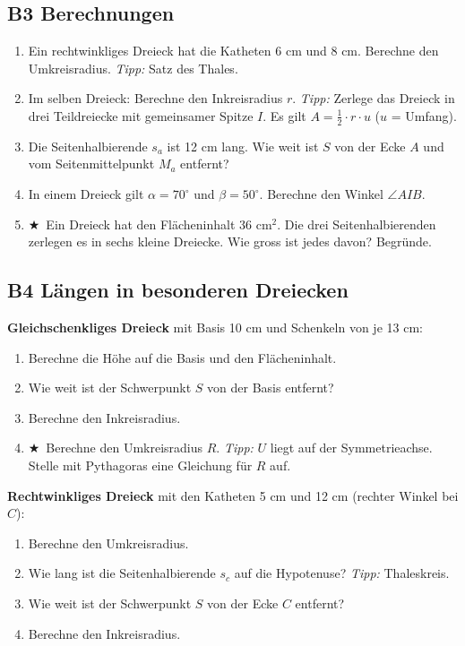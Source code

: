 \documentclass[11pt,a4paper]{article}
\newcommand{\stern}{$\bigstar$\ }
\begin{document}
\subsection{B3 \quad Berechnungen}
\begin{enumerate}
\item Ein rechtwinkliges Dreieck hat die Katheten 6 cm und 8 cm. Berechne den Umkreisradius. \emph{Tipp:} Satz des Thales.
\item Im selben Dreieck: Berechne den Inkreisradius $r$. \emph{Tipp:} Zerlege das Dreieck in drei Teildreiecke mit gemeinsamer Spitze $I$. Es gilt $A = \tfrac12 \cdot r \cdot u$ ($u$ = Umfang).
\item Die Seitenhalbierende $s_a$ ist 12 cm lang. Wie weit ist $S$ von der Ecke $A$ und vom Seitenmittelpunkt $M_a$ entfernt?
\item In einem Dreieck gilt $\alpha = 70^\circ$ und $\beta = 50^\circ$. Berechne den Winkel $\angle AIB$.
\item \stern Ein Dreieck hat den Fl\"acheninhalt 36 cm$^2$. Die drei Seitenhalbierenden zerlegen es in sechs kleine Dreiecke. Wie gross ist jedes davon? Begr\"unde.
\end{enumerate}

\subsection{B4 \quad L\"angen in besonderen Dreiecken}
\textbf{Gleichschenkliges Dreieck} mit Basis 10 cm und Schenkeln von je 13 cm:
\begin{enumerate}
\item Berechne die H\"ohe auf die Basis und den Fl\"acheninhalt.
\item Wie weit ist der Schwerpunkt $S$ von der Basis entfernt?
\item Berechne den Inkreisradius.
\item \stern Berechne den Umkreisradius $R$. \emph{Tipp:} $U$ liegt auf der Symmetrieachse. Stelle mit Pythagoras eine Gleichung f\"ur $R$ auf.
\end{enumerate}
\textbf{Rechtwinkliges Dreieck} mit den Katheten 5 cm und 12 cm (rechter Winkel bei $C$):
\begin{enumerate}
\item Berechne den Umkreisradius.
\item Wie lang ist die Seitenhalbierende $s_c$ auf die Hypotenuse? \emph{Tipp:} Thaleskreis.
\item Wie weit ist der Schwerpunkt $S$ von der Ecke $C$ entfernt?
\item Berechne den Inkreisradius.
\end{enumerate}
\end{document}
